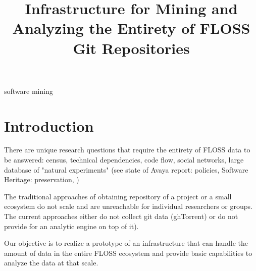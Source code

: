 \documentclass[conference]{IEEEtran}
\begin{document}
\title{Infrastructure for Mining and Analyzing the Entirety of FLOSS 
Git Repositories
}

\author{
\and
{}
}

\maketitle

\begin{abstract}

\end{abstract}

\begin{IEEEkeywords}
software mining
\end{IEEEkeywords}


\section{Introduction}

There are unique research questions that require the entirety of FLOSS data to be answered: census, technical dependencies, code flow, social networks, large database of "natural experiments"  (see state of Avaya report: policies, Software Heritage: preservation, )

The traditional approaches of obtaining repository of a project or a small ecosystem do not scale and are unreachable for individual researchers or groups. The current approaches either do not collect git data (ghTorrent) or do not provide for an analytic engine on top of it). 

Our objective is to realize a prototype of an infrastructure that can handle the amount of data in the entire FLOSS ecosystem and provide basic capabilities to analyze the data at that scale.  
\end{document}
